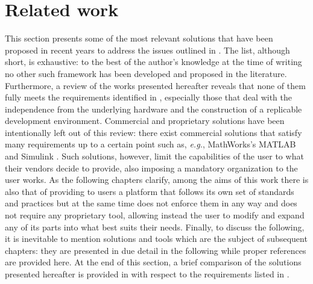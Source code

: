 \section{Related work}
\label{sec:prb_related_work}
This section presents some of the most relevant solutions that have been proposed in recent years to address the issues outlined in . The list, although short, is exhaustive: to the best of the author's knowledge at the time of writing no other such framework has been developed and proposed in the literature. Furthermore, a review of the works presented hereafter reveals that none of them fully meets the requirements identified in , especially those that deal with the independence from the underlying hardware and the construction of a replicable development environment. Commercial and proprietary solutions have been intentionally left out of this review: there exist commercial solutions that satisfy many requirements up to a certain point such as, \emph{e.g.}, MathWorks's MATLAB \cite{mathworks_matlab_nodate} and Simulink \cite{mathworks_simulink_nodate}. Such solutions, however, limit the capabilities of the user to what their vendors decide to provide, also imposing a mandatory organization to the user works. As the following chapters clarify, among the aims of this work there is also that of providing to users a platform that follows its own set of standards and practices but at the same time does not enforce them in any way and does not require any proprietary tool, allowing instead the user to modify and expand any of its parts into what best suits their needs. Finally, to discuss the following, it is inevitable to mention solutions and tools which are the subject of subsequent chapters: they are presented in due detail in the following while proper references are provided here. At the end of this section, a brief comparison of the solutions presented hereafter is provided in  with respect to the requirements listed in .

